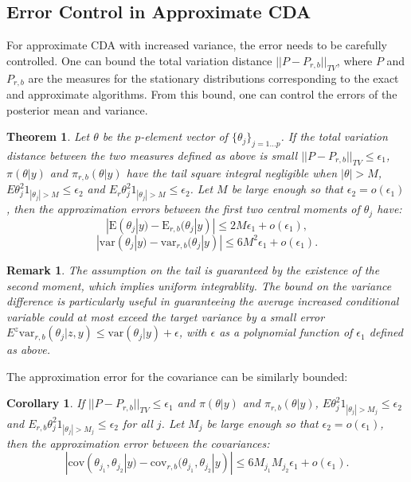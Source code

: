 \documentclass[10pt]{article}
\newtheorem{theorem}{Theorem}
\newtheorem{corollary}{Corollary}
\newtheorem{remark}{Remark}
\begin{document}
\subsection{Error Control in Approximate CDA}

For approximate CDA with increased variance, the error needs to be carefully controlled. One can bound the total variation distance $||{P}-{P}_{r,b} ||_{TV}$, where ${P}$ and ${P}_{r,b}$ are the measures for the stationary distributions corresponding to the exact and approximate algorithms. From this bound, one can control the errors of the posterior mean and variance.

\begin{theorem}
Let $\theta$ be the $p$-element vector of $\{\theta_j\}_{j=1\ldots p}$.
If the total variation distance between the two measures defined as above is small $||{P}- {P}_{r,b} ||_{TV}\le \epsilon_1$, $\pi(\theta|y)$ and $\pi_{r,b}(\theta|y)$ have the tail square integral negligible when $|\theta|>M$,  $E \theta_j^2 {1}_{|\theta_j|>M}\le \epsilon_2$ and $E_{r} \theta_j^2 {1}_{|\theta_j|>M}\le \epsilon_2$. Let $M$ be large enough so that $\epsilon_2=o(\epsilon_1)$, then the approximation errors between the first two central moments of $\theta_j$ have:
$$|\mbox{E}(\theta_j|y)-\mbox{E}_{r,b}(\theta_j|y)|\le 2M\epsilon_1+ o(\epsilon_1),$$
$$|\mbox{var}(\theta_j|y)-\mbox{var}_{r,b}(\theta_j|y)|\le 6M^2\epsilon_1+o(\epsilon_1).$$
\end{theorem}
 
 \begin{remark}
 	The assumption on the tail is guaranteed by the existence of the second moment, which implies uniform integrablity. The bound on the variance difference is particularly useful in guaranteeing the average increased conditional variable could at most exceed the target variance by a small error $E^z\mbox{var}_{r,b}(\theta_j|z,y)\le\mbox{var}(\theta_j|y)+\epsilon$, with $\epsilon$ as a polynomial function of $\epsilon_1$ defined as above.
 \end{remark}
 
 The approximation error for the covariance can be similarly bounded:

\begin{corollary}
If $||{P}- {P}_{r,b} ||_{TV}\le \epsilon_1$ and $\pi(\theta|y)$ and $\pi_{r,b}(\theta|y)$, $E \theta_j^2 {1}_{|\theta_j|>M_j}\le \epsilon_2$ and $E_{r,b} \theta_j^2 {1}_{|\theta_j|>M_j}\le \epsilon_2$ for all $j$.  Let $M_j$ be large enough so that $\epsilon_2=o(\epsilon_1)$, then the approximation error between the covariances:
$$|\mbox{cov}(\theta_{j_1},\theta_{j_2}|y)-\mbox{cov}_{r,b}(\theta_{j_1},\theta_{j_2}|y)|\le 6M_{j_1}M_{j_2}\epsilon_1+o(\epsilon_1 ).$$
\end{corollary}
\end{document}
